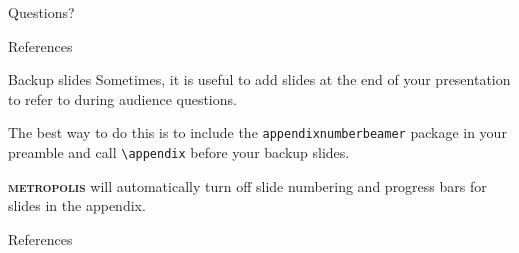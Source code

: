 \documentclass[10pt]{beamer}
\newcommand{\themename}{\textbf{\textsc{metropolis}}\xspace}
\begin{document}
\begin{frame}[standout]
  Questions?
\end{frame}


\begin{frame}{References}
\cite{knuth92,ConcreteMath,Simpson,Er01,greenwade93}
\end{frame}


\appendix

\begin{frame}[fragile]{Backup slides}
  Sometimes, it is useful to add slides at the end of your presentation to
  refer to during audience questions.

  The best way to do this is to include the \verb|appendixnumberbeamer|
  package in your preamble and call \verb|\appendix| before your backup slides.

  \themename will automatically turn off slide numbering and progress bars for
  slides in the appendix.
\end{frame}

\begin{frame}[allowframebreaks]{References}

  
  

\end{frame}
\end{document}
